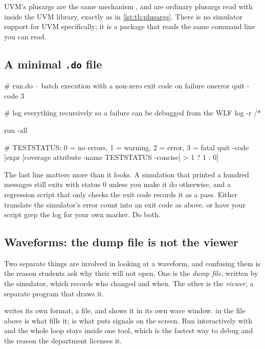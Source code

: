 \begin{notebox}{UVM's plusargs are the same mechanism}
,  and
 are ordinary plusargs read with
 inside the UVM library, exactly as in
\cref{lst:tb:plusargs}. There is no simulator support for UVM specifically; it
is a package that reads the same command line you can read.
\end{notebox}

\subsection{A minimal \texttt{.do} file}

\begin{tclcode}
# run.do -- batch execution with a non-zero exit code on failure
onerror {quit -code 3}

# log everything recursively so a failure can be debugged from the WLF
log -r /*

run -all

# TESTSTATUS: 0 = no errors, 1 = warning, 2 = error, 3 = fatal
quit -code [expr {[coverage attribute -name TESTSTATUS -concise] > 1 ? 1 : 0}]
\end{tclcode}

The last line matters more than it looks. A simulation that printed a hundred
 messages still exits with status 0 unless you make it do
otherwise, and a regression script that only checks the exit code records it as
a pass. Either translate the simulator's error count into an exit code as
above, or have your script grep the log for your own 
marker. Do both.

\subsection{Waveforms: the dump file is not the viewer}
\label{sec:tb:waves}

Two separate things are
involved in looking at a waveform, and confusing them is the reason students
ask why their  will not open. One is the \emph{dump file}, written
by the simulator, which records who changed and when. The other is the
\emph{viewer}, a separate program that draws it.

 writes its own format, a  file, and shows it in its
own wave window.  in the  file above is what fills it;
 is what puts signals on the screen. Run interactively
with  and the whole loop stays inside one tool,
which is the fastest way to debug and the reason the department licenses it.

